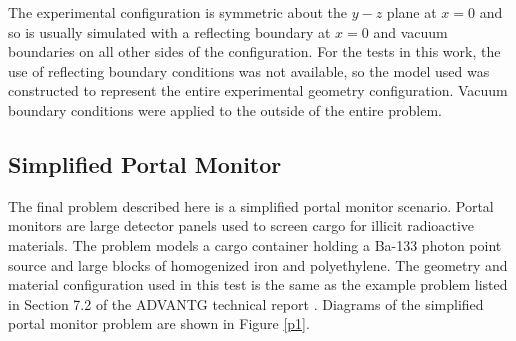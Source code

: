 \documentclass{article} %
\begin{document}
The experimental configuration is symmetric about the $y-z$ plane at $x = 0$
and so is usually simulated with a reflecting boundary at $x = 0$ and vacuum
boundaries on all other sides of the configuration. For the tests in this work,
the use of reflecting boundary conditions was not available, so the model used 
was constructed to represent the entire experimental geometry configuration.
Vacuum boundary conditions were applied to the outside of the entire problem.

\subsection{Simplified Portal Monitor}

The final problem described here is a simplified portal monitor scenario.
Portal monitors are large detector panels used to screen cargo for illicit
radioactive materials. The problem models a cargo container holding a Ba-133
photon point source and large blocks of homogenized iron and polyethylene. 
The geometry and material configuration used in this test is the same as the
example problem listed in Section 7.2 of the ADVANTG technical report
\cite{advantg}. Diagrams of the simplified portal monitor problem are shown in
Figure \ref{p1}.
\end{document}
